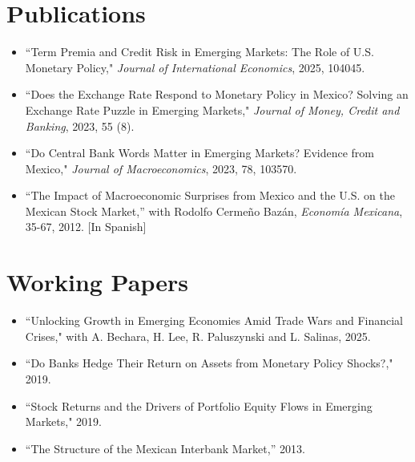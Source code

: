 \documentclass[12pt]{article}
\newcommand{\vsect}{\vspace{0.08cm}}
\begin{document}
	
	\section{Publications} 
	\vsect
	\begin{itemize}[label={},itemindent=-2em,leftmargin=2em,noitemsep,topsep=0pt]
		\item ``Term Premia and Credit Risk in Emerging Markets: The Role of U.S. Monetary Policy," \textit{Journal of International Economics}, 2025, 104045.
		\item ``Does the Exchange Rate Respond to Monetary Policy in Mexico? Solving an Exchange Rate Puzzle in Emerging Markets," \textit{Journal of Money, Credit and Banking}, 2023, 55 (8). %
		\item ``Do Central Bank Words Matter in Emerging Markets? Evidence from Mexico," \textit{Journal of Macroeconomics}, 2023, 78, 103570.
		\item ``The Impact of Macroeconomic Surprises from Mexico and the U.S. on the Mexican Stock Market,” with Rodolfo Cermeño Bazán, \textit{Economía Mexicana}, 35-67, 2012. [In Spanish]
	\end{itemize}
	
	
	\section{Working Papers}
	\vsect
	\begin{itemize}[label={},itemindent=-2em,leftmargin=2em,noitemsep,topsep=0pt]
	\item ``Unlocking Growth in Emerging Economies Amid Trade Wars and Financial Crises," with A. Bechara, H. Lee, R. Paluszynski and L. Salinas, 2025.
	\item ``Do Banks Hedge Their Return on Assets from Monetary Policy Shocks?," 2019.
	\item ``Stock Returns and the Drivers of Portfolio Equity Flows in Emerging Markets," 2019.
	\item ``The Structure of the Mexican Interbank Market,” 2013.
	\end{itemize}
	
	\pagestyle{fancy}
	
\end{document}
